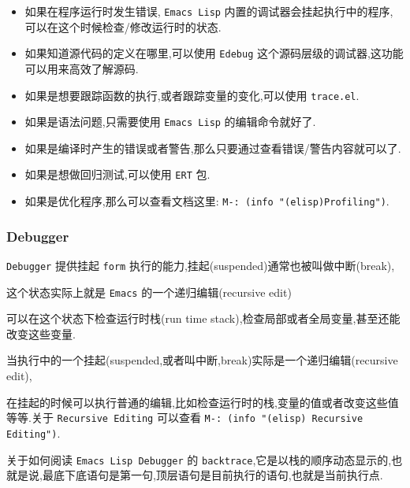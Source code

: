 \documentclass[11pt]{article}
\begin{document}
\begin{itemize}
\item 如果在程序运行时发生错误, \texttt{Emacs Lisp} 内置的调试器会挂起执行中的程序, 可以在这个时候检查/修改运行时的状态.

\item 如果知道源代码的定义在哪里,可以使用 \texttt{Edebug} 这个源码层级的调试器,这功能可以用来高效了解源码.

\item 如果是想要跟踪函数的执行,或者跟踪变量的变化,可以使用 \texttt{trace.el}.

\item 如果是语法问题,只需要使用 \texttt{Emacs Lisp} 的编辑命令就好了.

\item 如果是编译时产生的错误或者警告,那么只要通过查看错误/警告内容就可以了.

\item 如果是想做回归测试,可以使用 \texttt{ERT} 包.

\item 如果是优化程序,那么可以查看文档这里: \texttt{M-: (info "(elisp)Profiling")}.
\end{itemize}


\subsubsection{Debugger}
\label{sec:org6946f2a}

\texttt{Debugger} 提供挂起 \texttt{form} 执行的能力,挂起(suspended)通常也被叫做中断(break),

这个状态实际上就是 \texttt{Emacs} 的一个递归编辑(recursive edit)

可以在这个状态下检查运行时栈(run time stack),检查局部或者全局变量,甚至还能改变这些变量.



当执行中的一个挂起(suspended,或者叫中断,break)实际是一个递归编辑(recursive edit),

在挂起的时候可以执行普通的编辑,比如检查运行时的栈,变量的值或者改变这些值等等.关于 \texttt{Recursive Editing} 可以查看 \texttt{M-: (info "(elisp) Recursive Editing")}.

关于如何阅读 \texttt{Emacs Lisp Debugger} 的 \texttt{backtrace},它是以栈的顺序动态显示的,也就是说,最底下底语句是第一句,顶层语句是目前执行的语句,也就是当前执行点.
\end{document}
